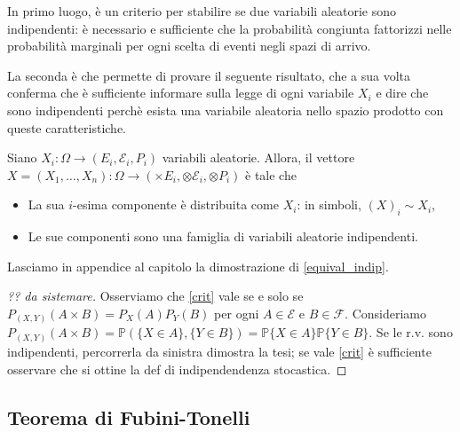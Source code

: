In primo luogo, è un criterio per stabilire se due variabili aleatorie sono indipendenti: è necessario e sufficiente che la probabilità congiunta fattorizzi nelle probabilità marginali per ogni scelta di eventi negli spazi di arrivo.

La seconda è che permette di provare il seguente risultato, che a sua volta conferma che è sufficiente informare sulla legge di ogni variabile $X_i$ e dire che sono indipendenti perchè esista una variabile aleatoria nello spazio prodotto con queste caratteristiche.

\begin{my_lemma}
	Siano $X_i : \Omega \to (E_i, \mathcal{E}_i, P_i)$ variabili aleatorie. Allora, il vettore $X=(X_1,\dots,X_n):\Omega \to (\times E_i, \otimes \mathcal{E}_i, \otimes P_i)$ è tale che 
	\begin{itemize}
		\item La sua $i$-esima componente è distribuita come $X_i$: in simboli, $(X)_i \sim X_i$,
		\item Le sue componenti sono una famiglia di variabili aleatorie indipendenti.
	\end{itemize}
\end{my_lemma}

Lasciamo in appendice al capitolo la dimostrazione di \ref{equival_indip}.

\begin{proof}[?? da sistemare]
	Osserviamo che \ref{crit} vale se e solo se $P_{(X,Y)} (A \times B) = P_X(A) P_Y(B)$ per ogni $A\in\mathcal{E}$ e $B\in\mathcal{F}$. Consideriamo $P_{(X,Y)} (A \times B) = \mathbb{P}(\{X \in A\},\{Y \in B\}) = \mathbb{P}\{X \in A\} \mathbb{P} \{Y \in B\}$. Se le r.v. sono indipendenti, percorrerla da sinistra dimostra la tesi; se vale \ref{crit} è sufficiente osservare che si ottine la def di indipendendenza stocastica.
\end{proof}

\subsection{Teorema di Fubini-Tonelli}

